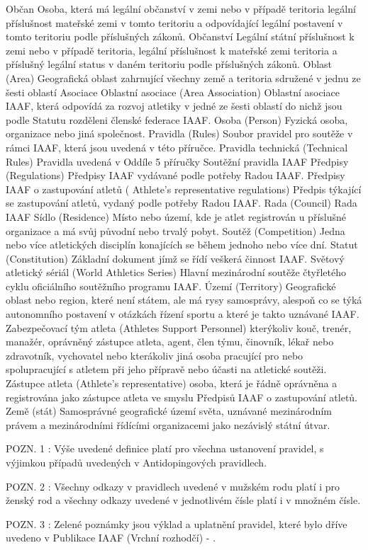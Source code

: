 \dend
\dt Občan
\dd Osoba, která má legální občanství v zemi nebo v případě teritoria legální příslušnost mateřské zemi v tomto teritoriu a odpovídající legální postavení v tomto teritoriu podle příslušných zákonů.
\dend
\dt Občanství
\dd Legální státní příslušnost k zemi nebo v případě teritoria, legální příslušnost k mateřské zemi teritoria a příslušný legální status v daném teritoriu podle příslušných zákonů.
\dend
\dt Oblast (Area)
\dd Geografická oblast zahrnující všechny země a teritoria sdružené v jednu ze šesti oblastí Asociace
\dend
\dt Oblastní asociace (Area Association)
\dd Oblastní asociace IAAF, která odpovídá za rozvoj atletiky v jedné ze šesti oblastí do nichž jsou podle Statutu rozděleni členské federace IAAF.
\dend
\dt Osoba (Person)
\dd Fyzická osoba, organizace nebo jiná společnost.
\dend
\dt Pravidla (Rules)
\dd Soubor pravidel pro soutěže v rámci IAAF, která jsou uvedená v této příručce.
\dend
\dt Pravidla technická (Technical Rules)
\dd Pravidla uvedená v Oddíle 5 příručky Soutěžní pravidla IAAF
\dend
\dt Předpisy (Regulations)
\dd Předpisy IAAF vydávané podle potřeby Radou IAAF.
\dend
\dt Předpisy IAAF o zastupování atletů ( Athlete's representative regulations)
\dd Předpis týkající se zastupování atletů, vydaný podle potřeby Radou IAAF.
\dend
\dt Rada (Council)
\dd Rada IAAF
\dend
\dt Sídlo (Residence)
\dd Místo nebo území, kde je atlet registrován u příslušné organizace a má svůj původní nebo trvalý pobyt.
\dend
\dt Soutěž (Competition)
\dd Jedna nebo více atletických disciplín konajících se během jednoho nebo více dní.
\dend
\dt Statut (Constitution)
\dd Základní dokument jímž se řídí veškerá činnost IAAF.
\dend
\dt Světový atletický sériál (World Athletics Series)
\dd Hlavní mezinárodní soutěže čtyřletého cyklu oficiálního soutěžního programu IAAF.
\dend
\dt Území (Territory)
\dd Geografické oblast nebo region, které není státem, ale má rysy samosprávy, alespoň co se týká autonomního postavení v otázkách řízení sportu a které je takto uznávané IAAF.
\dend
\dt Zabezpečovací tým atleta (Athletes Support Personnel)
\dd kterýkoliv kouč, trenér, manažér, oprávněný zástupce atleta, agent, člen týmu, činovník, lékař nebo zdravotník, vychovatel nebo kterákoliv jiná osoba pracující pro nebo spolupracující s atletem při jeho přípravě nebo účasti na atletické soutěži.
\dend
\dt Zástupce atleta (Athlete's representative)
\dd osoba, která je řádně oprávněna a registrována jako zástupce atleta ve smyslu Předpisů IAAF o zastupování atletů.
\dend
\dt Země (stát)
\dd Samosprávné geografické území světa, uznávané mezinárodním právem a mezinárodními řídícími organizacemi jako nezávislý státní útvar.
\dend

POZN. 1 : Výše uvedené definice platí pro všechna ustanovení pravidel, s výjimkou případů uvedených v Antidopingových pravidlech.

POZN. 2 : Všechny odkazy v pravidlech uvedené v mužském rodu platí i pro ženský rod a všechny odkazy uvedené v jednotlivém čísle platí i v množném čísle.

POZN. 3 : Zelené poznámky jsou výklad a uplatnění pravidel, které bylo dříve uvedeno v Publikace IAAF  (Vrchní rozhodčí) - .





\bye